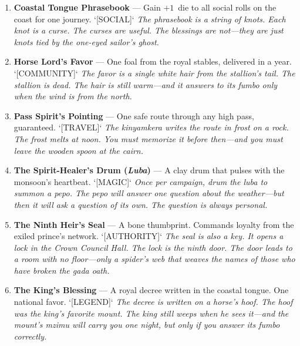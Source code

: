 \begin{enumerate}
\item \textbf{Coastal Tongue Phrasebook} --- Gain $+1$~die to all social rolls on the coast for one journey. `[SOCIAL]`
  \hfill \textit{The phrasebook is a string of knots. Each knot is a curse. The curses are useful. The blessings are not---they are just knots tied by the one-eyed sailor's ghost.}
\item \textbf{Horse Lord's Favor} --- One foal from the royal stables, delivered in a year. `[COMMUNITY]`
  \hfill \textit{The favor is a single white hair from the stallion's tail. The stallion is dead. The hair is still warm---and it answers to its \textit{fumbo} only when the wind is from the north.}
\item[J] \textbf{Pass Spirit's Pointing} --- One safe route through any high pass, guaranteed. `[TRAVEL]`
  \hfill \textit{The \textit{kinyamkera} writes the route in frost on a rock. The frost melts at noon. You must memorize it before then---and you must leave the wooden spoon at the cairn.}
\item[Q] \textbf{The Spirit-Healer's Drum (\textit{Luba})} --- A clay drum that pulses with the monsoon's heartbeat. `[MAGIC]`
  \hfill \textit{Once per campaign, drum the \textit{luba} to summon a \textit{pepo}. The \textit{pepo} will answer one question about the weather---but then it will ask a question of its own. The question is always personal.}
\item[K] \textbf{The Ninth Heir's Seal} --- A bone thumbprint. Commands loyalty from the exiled prince's network. `[AUTHORITY]`
  \hfill \textit{The seal is also a key. It opens a lock in the Crown Council Hall. The lock is the ninth door. The door leads to a room with no floor---only a spider's web that weaves the names of those who have broken the \textit{gada} oath.}
\item[A] \textbf{The King's Blessing} --- A royal decree written in the coastal tongue. One national favor. `[LEGEND]`
  \hfill \textit{The decree is written on a horse's hoof. The hoof was the king's favorite mount. The king still weeps when he sees it---and the mount's \textit{mzimu} will carry you one night, but only if you answer its \textit{fumbo} correctly.}
\end{enumerate}

